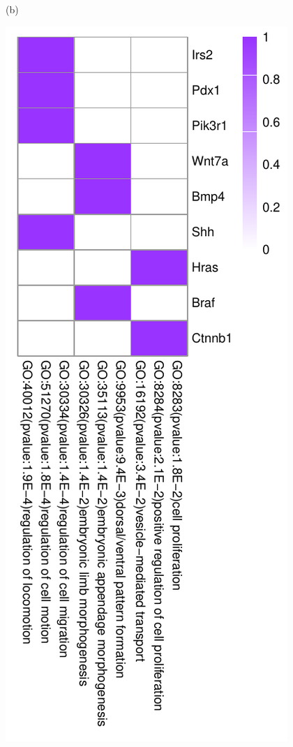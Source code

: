 \documentclass{bmcart}
\begin{document}
\begin{figure}[!h]
\begin{minipage}[b]{.45\linewidth}
    \centerline{(b)}
  \end{minipage}
  \hfil
  \begin{minipage}{.30\linewidth}
   \includegraphics[width=\linewidth]{DrawPictures/v20.pdf}

\end{minipage}
\end{figure}
\end{document}
